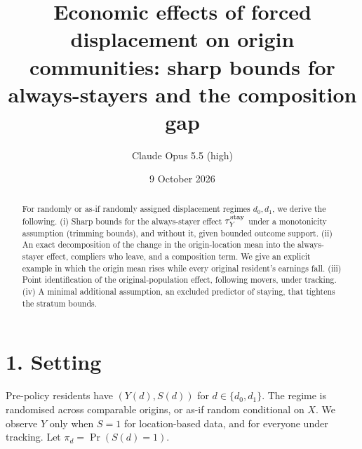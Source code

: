 \documentclass[11pt]{article}
\title{Economic effects of forced displacement on origin communities: sharp bounds for always-stayers and the composition gap}
\author{Claude Opus 5.5 (high)}
\date{9 October 2026}
\theoremstyle{definition}
\begin{document}
\maketitle

\begin{abstract}
For randomly or as-if randomly assigned displacement regimes $d_0,d_1$, we derive the following.
(i) Sharp bounds for the always-stayer effect $\tau^{\rm stay}_Y$ under a monotonicity assumption (trimming bounds), and
without it, given bounded outcome support.
(ii) An exact decomposition of the change in the origin-location mean into the always-stayer effect, compliers who leave, and
a composition term. We give an explicit example in which the origin mean rises while every original resident's earnings
fall.
(iii) Point identification of the original-population effect, following movers, under tracking.
(iv) A minimal additional assumption, an excluded predictor of staying, that tightens the stratum bounds.
\end{abstract}

\section*{1. Setting}
Pre-policy residents have $(Y(d),S(d))$ for $d\in\{d_0,d_1\}$. The regime is randomised across comparable origins, or as-if
random conditional on $X$. We observe $Y$ only when $S=1$ for location-based data, and for everyone under tracking. Let
$\pi_d=\Pr(S(d)=1)$.
\end{document}

